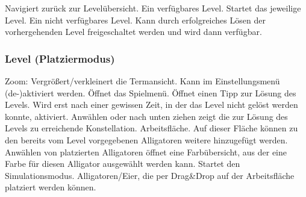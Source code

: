 \begin{requirements}
 Navigiert zurück zur Levelübersicht.
 Ein verfügbares Level. Startet das jeweilige Level.
 Ein nicht verfügbares Level. Kann durch erfolgreiches Lösen der vorhergehenden Level freigeschaltet werden und wird dann verfügbar.
\end{requirements}

\subsubsection{Level (Platziermodus)}

\begin{center}
\setlength\fboxsep{20pt}
\setlength\fboxrule{1pt}
\end{center}

\begin{requirements}
 Zoom: Vergrößert/verkleinert die Termansicht. Kann im Einstellungsmenü (de-)aktiviert werden.
 Öffnet das Spielmenü.
 Öffnet einen Tipp zur Lösung des Levels. Wird erst nach einer gewissen Zeit, in der das Level nicht gelöst werden konnte, aktiviert.
 Anwählen oder nach unten ziehen zeigt die zur Lösung des Levels zu erreichende Konstellation.
 Arbeitsfläche. Auf dieser Fläche können zu den bereits vom Level vorgegebenen Alligatoren weitere hinzugefügt werden. Anwählen von platzierten Alligatoren öffnet eine Farbübersicht, aus der eine Farbe für diesen Alligator ausgewählt werden kann.
 Startet den Simulationsmodus.
 Alligatoren/Eier, die per Drag\&Drop auf der Arbeitsfläche platziert werden können.
\end{requirements}

